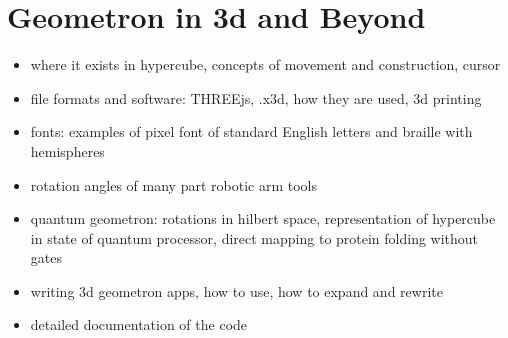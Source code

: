 
\section{Geometron in 3d and Beyond}

\begin{itemize}
\tightlist
\item
  where it exists in hypercube, concepts of movement and construction, cursor
\item
  file formats and software: THREEjs, .x3d, how they are used, 3d printing
\item
  fonts: examples of pixel font of standard English letters and braille with hemispheres
\item
  rotation angles of many part robotic arm tools
\item
  quantum geometron: rotations in hilbert space, representation of hypercube in state of quantum processor, direct mapping to protein folding without gates 
\item
  writing 3d geometron apps, how to use, how to expand and rewrite
\item 
  detailed documentation of the code

\end{itemize}
